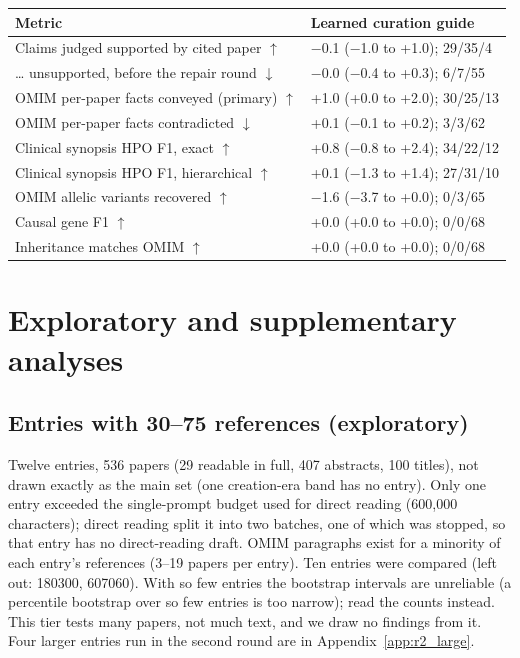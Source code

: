 \documentclass{article} %
\begin{document}
\begin{table}[!htbp]
\begin{tabularx}{\linewidth}{>{\raggedright\arraybackslash}p{5.6cm}>{\centering\arraybackslash}X}
\toprule
Metric & Learned curation guide \\
\midrule
Claims judged supported by cited paper $\uparrow$ & $-$0.1 ($-$1.0 to +1.0); 29/35/4 \\
\ldots{} unsupported, before the repair round $\downarrow$ & $-$0.0 ($-$0.4 to +0.3); 6/7/55 \\
OMIM per-paper facts conveyed (primary) $\uparrow$ & +1.0 (+0.0 to +2.0); 30/25/13 \\
OMIM per-paper facts contradicted $\downarrow$ & +0.1 ($-$0.1 to +0.2); 3/3/62 \\
Clinical synopsis HPO F1, exact $\uparrow$ & +0.8 ($-$0.8 to +2.4); 34/22/12 \\
Clinical synopsis HPO F1, hierarchical $\uparrow$ & +0.1 ($-$1.3 to +1.4); 27/31/10 \\
OMIM allelic variants recovered $\uparrow$ & $-$1.6 ($-$3.7 to +0.0); 0/3/65 \\
Causal gene F1 $\uparrow$ & +0.0 (+0.0 to +0.0); 0/0/68 \\
Inheritance matches OMIM $\uparrow$ & +0.0 (+0.0 to +0.0); 0/0/68 \\
\bottomrule
\end{tabularx}
\end{table}

\FloatBarrier
\section{Exploratory and supplementary analyses}
\FloatBarrier
\subsection{Entries with 30--75 references (exploratory)}
\label{app:large}
Twelve entries, 536 papers (29 readable in full, 407 abstracts, 100 titles), not drawn exactly as the main set (one creation-era band has no entry). Only one entry exceeded the single-prompt budget used for direct reading (600,000 characters); direct reading split it into two batches, one of which was stopped, so that entry has no direct-reading draft. OMIM paragraphs exist for a minority of each entry's references (3--19 papers per entry). Ten entries were compared (left out: 180300, 607060). With so few entries the bootstrap intervals are unreliable (a percentile bootstrap over so few entries is too narrow); read the counts instead. This tier tests many papers, not much text, and we draw no findings from it. Four larger entries run in the second round are in Appendix~\ref{app:r2_large}.
\end{document}

